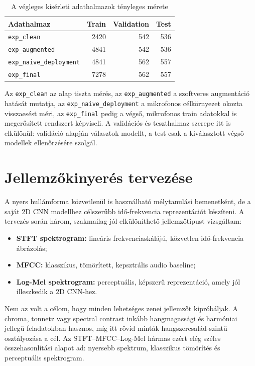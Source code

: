 \begin{table}[H]
\centering
\caption{A végleges kísérleti adathalmazok tényleges mérete}
\label{tab:final_dataset_counts}
\begin{tabular}{lrrr}
\toprule
\textbf{Adathalmaz} & \textbf{Train} & \textbf{Validation} & \textbf{Test} \\
\midrule
\texttt{exp\_clean} & 2420 & 542 & 536 \\
\texttt{exp\_augmented} & 4841 & 542 & 536 \\
\texttt{exp\_naive\_deployment} & 4841 & 562 & 557 \\
\texttt{exp\_final} & 7278 & 562 & 557 \\
\bottomrule
\end{tabular}
\end{table}

Az \texttt{exp\_clean} az alap tiszta mérés, az \texttt{exp\_augmented} a szoftveres augmentáció hatását mutatja, az \texttt{exp\_naive\_deployment} a mikrofonos célkörnyezet okozta visszaesést méri, az \texttt{exp\_final} pedig a végső, mikrofonos train adatokkal is megerősített rendszert képviseli. A validációs és teszthalmaz szerepe itt is elkülönül: validáció alapján választok modellt, a test csak a kiválasztott végső modellek ellenőrzésére szolgál.

\section{Jellemzőkinyerés tervezése}
\label{sec:feature_extraction}

A nyers hullámforma közvetlenül is használható mélytanulási bemenetként, de a saját 2D CNN modellhez célszerűbb idő-frekvencia reprezentációt készíteni. A tervezés során három, szakmailag jól elkülöníthető jellemzőtípust vizsgáltam:
\begin{itemize}
  \item \textbf{STFT spektrogram:} lineáris frekvenciaskálájú, közvetlen idő-frekvencia ábrázolás;
  \item \textbf{MFCC:} klasszikus, tömörített, kepsztrális audio baseline;
  \item \textbf{Log-Mel spektrogram:} perceptuális, képszerű reprezentáció, amely jól illeszkedik a 2D CNN-hez.
\end{itemize}

Nem az volt a célom, hogy minden lehetséges zenei jellemzőt kipróbáljak. A chroma, tonnetz vagy spectral contrast inkább hangmagassági és harmóniai jellegű feladatokban hasznos, míg itt rövid minták hangszercsalád-szintű osztályozása a cél. Az STFT--MFCC--Log-Mel hármas ezért elég széles összehasonlítási alapot ad: nyersebb spektrum, klasszikus tömörítés és perceptuális spektrogram.

